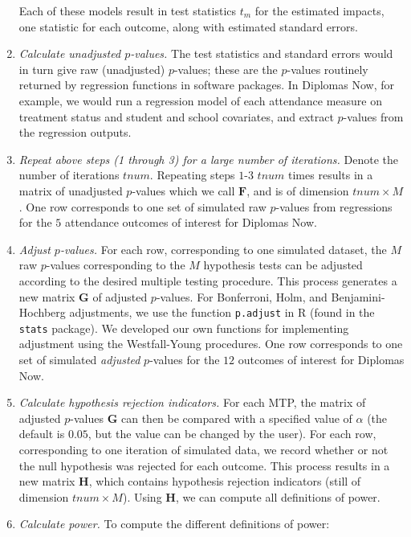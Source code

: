 \documentclass[
]{article}
\begin{document}
\begin{enumerate}
  Each of these models result in test statistics \(t_m\) for the
  estimated impacts, one statistic for each outcome, along with
  estimated standard errors.
\item
  \emph{Calculate unadjusted \(p\)-values.} The test statistics and
  standard errors would in turn give raw (unadjusted) \(p\)-values;
  these are the \(p\)-values routinely returned by regression functions
  in software packages. In Diplomas Now, for example, we would run a
  regression model of each attendance measure on treatment status and
  student and school covariates, and extract \(p\)-values from the
  regression outputs.
\item
  \emph{Repeat above steps (1 through 3) for a large number of
  iterations.} Denote the number of iterations \(tnum\). Repeating steps
  \(1\)-\(3\) \(tnum\) times results in a matrix of unadjusted
  \(p\)-values which we call \(\mathbf{F}\), and is of dimension
  \(tnum \times M\). One row corresponds to one set of simulated raw
  \(p\)-values from regressions for the \(5\) attendance outcomes of
  interest for Diplomas Now.
\item
  \emph{Adjust \(p\)-values.} For each row, corresponding to one
  simulated dataset, the \(M\) raw \(p\)-values corresponding to the
  \(M\) hypothesis tests can be adjusted according to the desired
  multiple testing procedure. This process generates a new matrix
  \(\mathbf{G}\) of adjusted \(p\)-values. For Bonferroni, Holm, and
  Benjamini-Hochberg adjustments, we use the function \texttt{p.adjust}
  in R (found in the \texttt{stats} package). We developed our own
  functions for implementing adjustment using the Westfall-Young
  procedures. One row corresponds to one set of simulated
  \emph{adjusted} \(p\)-values for the \(12\) outcomes of interest for
  Diplomas Now.
\item
  \emph{Calculate hypothesis rejection indicators.} For each MTP, the
  matrix of adjusted \(p\)-values \(\mathbf{G}\) can then be compared
  with a specified value of \(\alpha\) (the default is \(0.05\), but the
  value can be changed by the user). For each row, corresponding to one
  iteration of simulated data, we record whether or not the null
  hypothesis was rejected for each outcome. This process results in a
  new matrix \(\mathbf{H}\), which contains hypothesis rejection
  indicators (still of dimension \(tnum \times M\)). Using
  \(\mathbf{H}\), we can compute all definitions of power.
\item
  \emph{Calculate power.} To compute the different definitions of power:
\end{enumerate}
\end{document}
